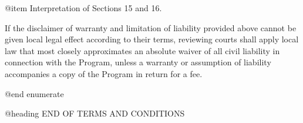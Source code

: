 @item Interpretation of Sections 15 and 16.

If the disclaimer of warranty and limitation of liability provided
above cannot be given local legal effect according to their terms,
reviewing courts shall apply local law that most closely approximates
an absolute waiver of all civil liability in connection with the
Program, unless a warranty or assumption of liability accompanies a
copy of the Program in return for a fee.

@end enumerate

@heading END OF TERMS AND CONDITIONS


